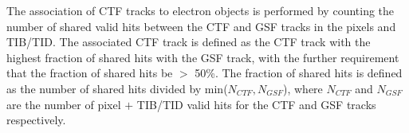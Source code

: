 The association of CTF tracks to electron objects is performed by counting the 
number of shared valid hits between the CTF and GSF tracks in the pixels and TIB/TID.
The associated CTF track is defined as the CTF track with the highest fraction of
shared hits with the GSF track, with the further requirement that the fraction 
of shared hits be $>$ 50\%.  The
fraction of shared hits is defined as the number of shared hits divided by
min($N_{CTF},N_{GSF}$), where $N_{CTF}$ and $N_{GSF}$ are the number of pixel $+$ 
TIB/TID valid hits for the CTF and GSF tracks respectively.

